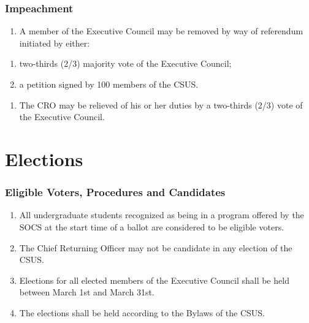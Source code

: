 \section{Impeachment}\label{impeachment}

\begin{enumerate}
\def\labelenumi{\arabic{enumi}.}
\tightlist
\item
  A member of the Executive Council may be removed by way of referendum
  initiated by either:
\end{enumerate}

\begin{enumerate}
\def\labelenumi{(\alph{enumi})}
\tightlist
\item
  two-thirds (2/3) majority vote of the Executive Council;
\item
  a petition signed by 100 members of the
  CSUS.
\end{enumerate}

\begin{enumerate}
\def\labelenumi{\arabic{enumi}.}
\setcounter{enumi}{1}
\tightlist
\item
  The CRO may be relieved of his or her duties by a two-thirds (2/3)
  vote of the Executive Council.
\end{enumerate}

\part{Elections}\label{elections}

\section{Eligible Voters, Procedures and
Candidates}\label{eligible-voters-procedures-and-candidates}

\begin{enumerate}
\def\labelenumi{\arabic{enumi}.}
\item
  All undergraduate students recognized as being in a program offered by
  the SOCS at the start time of a ballot are considered to be eligible
  voters.
\item
  The Chief Returning Officer may not be candidate in any election of
  the CSUS.
\item
  Elections for all elected members of the Executive Council shall be
  held between March 1st and March 31st.
\item
  The elections shall be held according to the Bylaws of the CSUS.
\end{enumerate}

